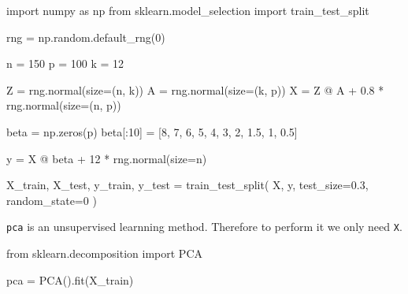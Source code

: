 \documentclass[
  letterpaper,
  DIV=11,
  numbers=noendperiod]{scrreprt}
\newenvironment{Shaded}{\begin{snugshade}}{\end{snugshade}}
\newcommand{\DecValTok}[1]{\textcolor[rgb]{0.68,0.00,0.00}{#1}}
\newcommand{\FloatTok}[1]{\textcolor[rgb]{0.68,0.00,0.00}{#1}}
\newcommand{\ImportTok}[1]{\textcolor[rgb]{0.00,0.46,0.62}{#1}}
\newcommand{\NormalTok}[1]{\textcolor[rgb]{0.00,0.23,0.31}{#1}}
\newcommand{\OperatorTok}[1]{\textcolor[rgb]{0.37,0.37,0.37}{#1}}
\theoremstyle{definition}
\theoremstyle{definition}
\theoremstyle{plain}
\theoremstyle{plain}
\theoremstyle{remark}
\begin{document}
\begin{Shaded}
\begin{Highlighting}[]
\ImportTok{import}\NormalTok{ numpy }\ImportTok{as}\NormalTok{ np}
\ImportTok{from}\NormalTok{ sklearn.model\_selection }\ImportTok{import}\NormalTok{ train\_test\_split}

\NormalTok{rng }\OperatorTok{=}\NormalTok{ np.random.default\_rng(}\DecValTok{0}\NormalTok{)}

\NormalTok{n }\OperatorTok{=} \DecValTok{150}
\NormalTok{p }\OperatorTok{=} \DecValTok{100}
\NormalTok{k }\OperatorTok{=} \DecValTok{12}

\NormalTok{Z }\OperatorTok{=}\NormalTok{ rng.normal(size}\OperatorTok{=}\NormalTok{(n, k))}
\NormalTok{A }\OperatorTok{=}\NormalTok{ rng.normal(size}\OperatorTok{=}\NormalTok{(k, p))}
\NormalTok{X }\OperatorTok{=}\NormalTok{ Z }\OperatorTok{@}\NormalTok{ A }\OperatorTok{+} \FloatTok{0.8} \OperatorTok{*}\NormalTok{ rng.normal(size}\OperatorTok{=}\NormalTok{(n, p))}

\NormalTok{beta }\OperatorTok{=}\NormalTok{ np.zeros(p)}
\NormalTok{beta[:}\DecValTok{10}\NormalTok{] }\OperatorTok{=}\NormalTok{ [}\DecValTok{8}\NormalTok{, }\DecValTok{7}\NormalTok{, }\DecValTok{6}\NormalTok{, }\DecValTok{5}\NormalTok{, }\DecValTok{4}\NormalTok{, }\DecValTok{3}\NormalTok{, }\DecValTok{2}\NormalTok{, }\FloatTok{1.5}\NormalTok{, }\DecValTok{1}\NormalTok{, }\FloatTok{0.5}\NormalTok{]}

\NormalTok{y }\OperatorTok{=}\NormalTok{ X }\OperatorTok{@}\NormalTok{ beta }\OperatorTok{+} \DecValTok{12} \OperatorTok{*}\NormalTok{ rng.normal(size}\OperatorTok{=}\NormalTok{n)}

\NormalTok{X\_train, X\_test, y\_train, y\_test }\OperatorTok{=}\NormalTok{ train\_test\_split(}
\NormalTok{    X, y, test\_size}\OperatorTok{=}\FloatTok{0.3}\NormalTok{, random\_state}\OperatorTok{=}\DecValTok{0}
\NormalTok{)}
\end{Highlighting}
\end{Shaded}

\texttt{pca} is an unsupervised learnning method. Therefore to perform
it we only need \texttt{X}.

\begin{Shaded}
\begin{Highlighting}[]
\ImportTok{from}\NormalTok{ sklearn.decomposition }\ImportTok{import}\NormalTok{ PCA}

\NormalTok{pca }\OperatorTok{=}\NormalTok{ PCA().fit(X\_train)}
\end{Highlighting}
\end{Shaded}
\end{document}
